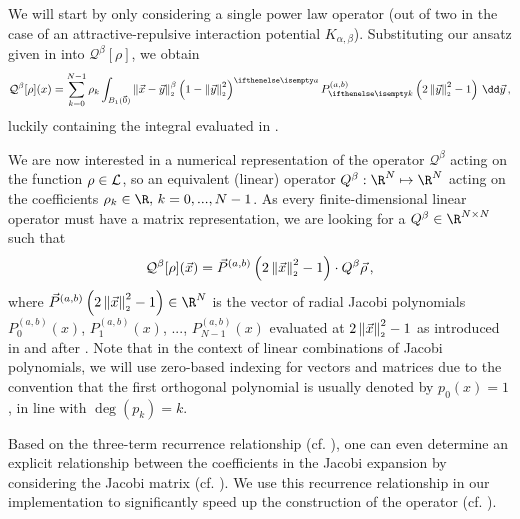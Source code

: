 We will start by only considering a single power law operator (out of two in the case of an attractive-repulsive interaction potential $K_{\alpha, \beta}$).
Substituting our ansatz given in  into $\mathcal{Q}^\beta[\rho]$, we obtain
\begin{equation}
  \mathcal{Q}^{\beta}[\rho](x) = \sum_{k=0}^{N-1} \rho_{k} \int_{B_1(\vec{0})} \norm{\vec{x}-\vec{y}}^{\beta} \weight{y}\jacobi{y} \,\dd\vec{y}\,,
  \label{eq:theorem216-in-derivation}
\end{equation}
luckily containing the integral evaluated in .

We are now interested in a numerical representation of the operator $\mathcal{Q}^\beta$ acting on the function $\rho \in \mathcal{L}$, so an equivalent (linear) operator $Q^\beta: \R^N \mapsto \R^N$ acting on the coefficients $\rho_k \in \R,\, k = 0, ..., N-1$.
As every finite-dimensional linear operator must have a matrix representation, we are looking for a $Q^\beta \in \R^{N \times N}$ such that
$$\mathcal{Q}^\beta[\rho](\vec{x}) = \vec{P}^{(a, b)}\left(2 \left\lVert\vec{x}\right\rVert_{\scriptscriptstyle 2}^2 - 1\right) \cdot Q^\beta \vec{\rho}\,,$$
where $\jacobivec{x} \in \R^N$ is the vector of radial Jacobi polynomials $P^{(a, b)}_0(x)$, $P^{(a, b)}_1(x)$, ..., $P^{(a, b)}_{N-1}(x)$ evaluated at $2\left\lVert\vec{x}\right\rVert_{\scriptscriptstyle 2}^2 - 1$ as introduced in and after .
Note that in the context of linear combinations of Jacobi polynomials, we will use zero-based indexing for vectors and matrices due to the convention that the first orthogonal polynomial is usually denoted by $p_0(x) = 1$, in line with $\deg(p_k) = k$.

Based on the three-term recurrence relationship (cf. ), one can even determine an explicit relationship between the coefficients in the Jacobi expansion by considering the Jacobi matrix (cf. ).
We use this recurrence relationship in our implementation to significantly speed up the construction of the operator (cf. ).

